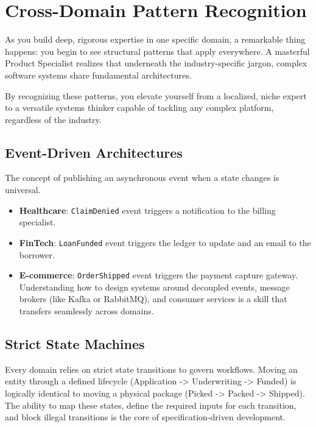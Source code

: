 \documentclass[
  11pt,
  openany,
  oneside]{book}
\providecommand{\tightlist}{%
  \setlength{\itemsep}{0pt}\setlength{\parskip}{0pt}}
\begin{document}
\bigskip

\section{Cross-Domain Pattern
Recognition}\label{cross-domain-pattern-recognition}

As you build deep, rigorous expertise in one specific domain, a
remarkable thing happens: you begin to see structural patterns that
apply everywhere. A masterful Product Specialist realizes that
underneath the industry-specific jargon, complex software systems share
fundamental architectures.

By recognizing these patterns, you elevate yourself from a localized,
niche expert to a versatile systems thinker capable of tackling any
complex platform, regardless of the industry.

\subsection{Event-Driven
Architectures}\label{event-driven-architectures}

The concept of publishing an asynchronous event when a state changes is
universal.

\begin{itemize}
\tightlist
\item
  \textbf{Healthcare}: \texttt{ClaimDenied} event triggers a
  notification to the billing specialist.
\item
  \textbf{FinTech}: \texttt{LoanFunded} event triggers the ledger to
  update and an email to the borrower.
\item
  \textbf{E-commerce}: \texttt{OrderShipped} event triggers the payment
  capture gateway. Understanding how to design systems around decoupled
  events, message brokers (like Kafka or RabbitMQ), and consumer
  services is a skill that transfers seamlessly across domains.
\end{itemize}

\subsection{Strict State Machines}\label{strict-state-machines}

Every domain relies on strict state transitions to govern workflows.
Moving an entity through a defined lifecycle (Application
-\textgreater{} Underwriting -\textgreater{} Funded) is logically
identical to moving a physical package (Picked -\textgreater{} Packed
-\textgreater{} Shipped). The ability to map these states, define the
required inputs for each transition, and block illegal transitions is
the core of specification-driven development.
\end{document}
